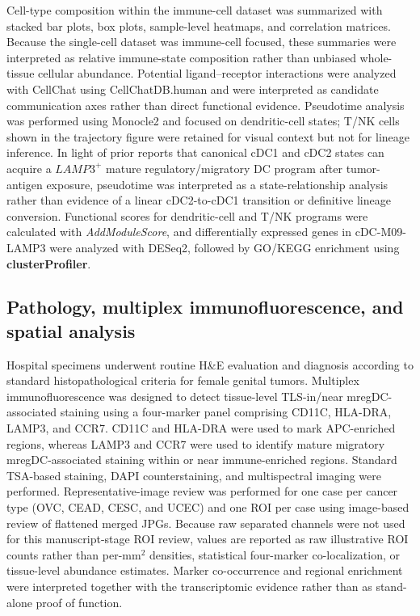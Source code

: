 \documentclass[pdflatex,sn-vancouver-num]{sn-jnl}
\begin{document}
Cell-type composition within the immune-cell dataset was summarized with stacked bar plots, box plots, sample-level heatmaps, and correlation matrices\cite{bib45,bib46}. Because the single-cell dataset was immune-cell focused, these summaries were interpreted as relative immune-state composition rather than unbiased whole-tissue cellular abundance. Potential ligand--receptor interactions were analyzed with CellChat using CellChatDB.human and were interpreted as candidate communication axes rather than direct functional evidence\cite{bib47}. Pseudotime analysis was performed using Monocle2 and focused on dendritic-cell states; T/NK cells shown in the trajectory figure were retained for visual context but not for lineage inference\cite{bib48}. In light of prior reports that canonical cDC1 and cDC2 states can acquire a $LAMP3^{+}$ mature regulatory/migratory DC program after tumor-antigen exposure, pseudotime was interpreted as a state-relationship analysis rather than evidence of a linear cDC2-to-cDC1 transition or definitive lineage conversion\cite{bib17,bib18,bib20,bib21}. Functional scores for dendritic-cell and T/NK programs were calculated with \textit{AddModuleScore}, and differentially expressed genes in cDC-M09-LAMP3 were analyzed with DESeq2, followed by GO/KEGG enrichment using \textbf{clusterProfiler}\cite{bib49,bib50,bib51}.

\subsection{Pathology, multiplex immunofluorescence, and spatial analysis}
Hospital specimens underwent routine H\&E evaluation and diagnosis according to standard histopathological criteria for female genital tumors\cite{bib52}. Multiplex immunofluorescence was designed to detect tissue-level TLS-in/near mregDC-associated staining using a four-marker panel comprising CD11C, HLA-DRA, LAMP3, and CCR7. CD11C and HLA-DRA were used to mark APC-enriched regions, whereas LAMP3 and CCR7 were used to identify mature migratory mregDC-associated staining within or near immune-enriched regions. Standard TSA-based staining, DAPI counterstaining, and multispectral imaging were performed. Representative-image review was performed for one case per cancer type (OVC, CEAD, CESC, and UCEC) and one ROI per case using image-based review of flattened merged JPGs. Because raw separated channels were not used for this manuscript-stage ROI review, values are reported as raw illustrative ROI counts rather than per-mm$^{2}$ densities, statistical four-marker co-localization, or tissue-level abundance estimates. Marker co-occurrence and regional enrichment were interpreted together with the transcriptomic evidence rather than as stand-alone proof of function.
\end{document}
